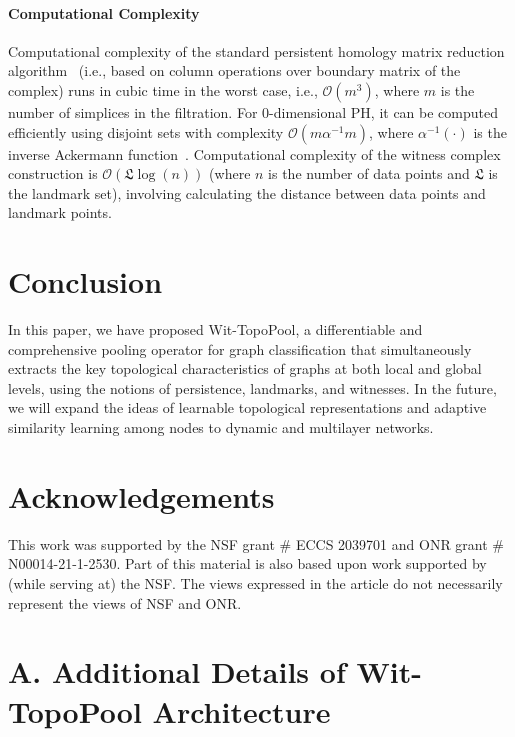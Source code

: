\documentclass[letterpaper]{article} %
\begin{document}
\paragraph{Computational Complexity} Computational complexity of the standard persistent homology matrix reduction algorithm~\cite{edelsbrunner2000topological} (i.e., based on column operations over boundary matrix of the complex) runs in cubic time in the worst case, i.e., $\mathcal{O}(m^3)$, where $m$ is the number of simplices in the filtration. For 0-dimensional PH, it can be computed efficiently using disjoint sets with complexity $\mathcal{O}(m\alpha^{-1}m)$, where $\alpha^{-1}(\cdot)$ is the inverse Ackermann function~\cite{cormen2022introduction}. Computational complexity of the witness complex construction is $\mathcal{O}(\mathfrak{L} \log{(n)})$ (where $n$ is the number of data points and $\mathfrak{L}$ is the landmark set), involving calculating the distance between data points and landmark points.

\section{Conclusion}
In this paper, we have proposed Wit-TopoPool, a differentiable and comprehensive pooling operator for graph classification that simultaneously extracts the key topological characteristics of graphs at both local and global levels, using the notions of persistence, landmarks, and witnesses. In the future, we will expand the ideas of learnable topological representations and adaptive similarity learning among nodes to dynamic and multilayer networks.
\section{Acknowledgements}
This work was supported by the NSF grant \# ECCS 2039701 and ONR grant \# N00014-21-1-2530. Part of this material is also based upon work supported by (while serving at) the NSF. The views expressed in the article do not necessarily represent the views of NSF and ONR. 




\clearpage
\appendix
\section{A. Additional Details of Wit-TopoPool Architecture}
\end{document}
